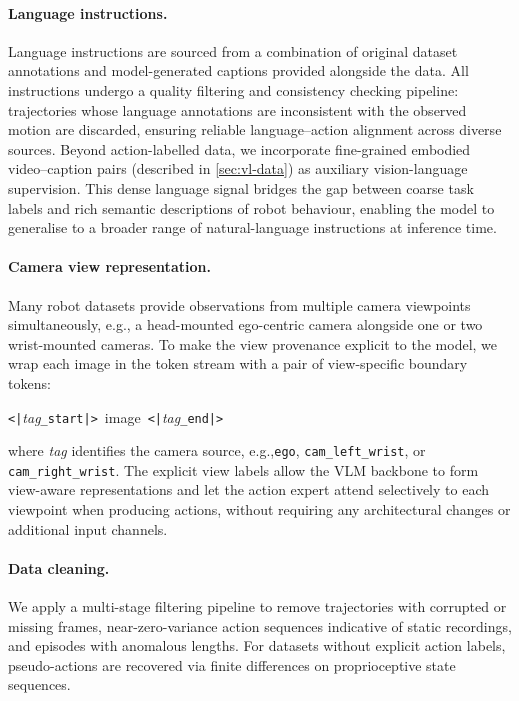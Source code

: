 \documentclass{llmxive}
\providecommand{\eg}{e.g.,\xspace}
\begin{document}
\paragraph{Language instructions.}
Language instructions are sourced from a combination of original dataset
annotations and model-generated captions provided alongside the data.
All instructions undergo a quality filtering and consistency checking pipeline:
trajectories whose language annotations are inconsistent with the observed
motion are discarded, ensuring reliable language--action alignment across
diverse sources.
Beyond action-labelled data, we incorporate fine-grained embodied video--caption
pairs (described in \cref{sec:vl-data}) as auxiliary vision-language supervision.
This dense language signal bridges the gap between coarse task labels and rich
semantic descriptions of robot behaviour, enabling the model to generalise to a
broader range of natural-language instructions at inference time.

\paragraph{Camera view representation.}
Many robot datasets provide observations from multiple camera viewpoints
simultaneously, \eg a head-mounted ego-centric camera alongside one or two
wrist-mounted cameras.
To make the view provenance explicit to the model, we wrap each image in the
token stream with a pair of view-specific boundary tokens:
\begin{center}
\texttt{<|}\textit{tag}\texttt{\_start|>}\ \textlangle image\textrangle\ \texttt{<|}\textit{tag}\texttt{\_end|>}
\end{center}
where \textit{tag} identifies the camera source, \eg \texttt{ego},
\texttt{cam\_left\_wrist}, or \texttt{cam\_right\_wrist}.
The explicit view labels allow the VLM backbone to form view-aware
representations and let the action expert attend selectively to each
viewpoint when producing actions, without requiring any architectural
changes or additional input channels.

\paragraph{Data cleaning.}
We apply a multi-stage filtering pipeline to remove trajectories with corrupted
or missing frames, near-zero-variance action sequences indicative of static
recordings, and episodes with anomalous lengths. For datasets without explicit
action labels, pseudo-actions are recovered via finite differences on
proprioceptive state sequences.
\end{document}
